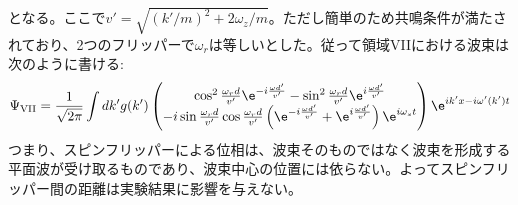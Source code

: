 となる。ここで$v'=\sqrt{(k'/m)^2+2\omega_z/m}$。ただし簡単のため共鳴条件が満たされており、2つのフリッパーで$\omega_r$は等しいとした。従って領域VIIにおける波束は次のように書ける:
\begin{equation}
\Psi_\mathrm{VII}=\frac{1}{\sqrt{2\pi}}\int dk' g(k') \begin{pmatrix} \cos^2 \frac{\omega_r d}{v'} \e^{-i\frac{\omega d'}{v'}} -\sin^2 \frac{\omega_r d}{v'} \e^{i\frac{\omega d'}{v'}} \\ -i\sin\frac{\omega_r d}{v'}\cos\frac{\omega_r d}{v'}\left(\e^{-i\frac{\omega d'}{v'}}+\e^{i\frac{\omega d'}{v'}} \right) \e^{i\omega_s t} \end{pmatrix} \e^{i k'x-i\omega'(k')t}
\end{equation}
つまり、スピンフリッパーによる位相は、波束そのものではなく波束を形成する平面波が受け取るものであり、波束中心の位置には依らない。よってスピンフリッパー間の距離は実験結果に影響を与えない。
\renewcommand{\arraystretch}{1}

